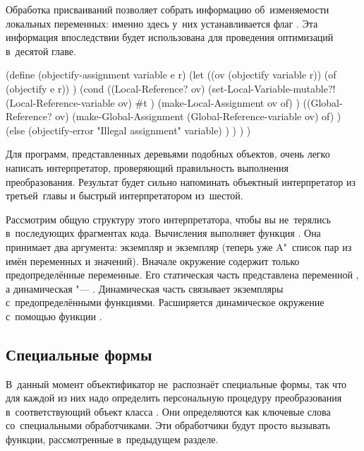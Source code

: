 Обработка присваиваний позволяет собрать информацию об~изменяемости локальных
переменных: именно здесь у~них устанавливается флаг . Эта
информация впоследствии будет использована для проведения оптимизаций в~десятой
главе. \seePage[chapter:cc]

\begin{code:lisp}
(define (objectify-assignment variable e r)
  (let ((ov (objectify variable r))
        (of (objectify e r)) )
    (cond ((Local-Reference? ov)
           (set-Local-Variable-mutable?!
            (Local-Reference-variable ov) #t )
           (make-Local-Assignment ov of) )
          ((Global-Reference? ov)
           (make-Global-Assignment (Global-Reference-variable ov) of) )
          (else
           (objectify-error "Illegal assignment" variable) ) ) ) )
\end{code:lisp}

Для программ, представленных деревьями подобных объектов, очень легко написать
интерпретатор, проверяющий правильность выполнения преобразования. Результат
будет сильно напоминать объектный интерпретатор из третьей~главы и быстрый
интерпретатором из~шестой.

Рассмотрим общую структуру этого интерпретатора, чтобы вы не~терялись
в~последующих фрагментах кода. Вычисления выполняет функция . Она
принимает два аргумента: экземпляр  и экземпляр 
(теперь уже A"~список пар из имён переменных и значений). Вначале окружение
содержит только предопределённые переменные. Его статическая часть представлена
переменной , а динамическая "--- . Динамическая часть
связывает экземпляры  с~предопределёнными функциями.
Расширяется динамическое окружение с~помощью функции .


\subsection{Специальные формы}\label{macros/macrosystem/ssect:special}

В~данный момент объектификатор не~распознаёт специальные формы, так что для
каждой из них надо определить персональную процедуру преобразования
в~соответствующий объект класса . Они определяются как ключевые
слова со~специальными обработчиками. Эти обработчики будут просто вызывать
функции, рассмотренные в~предыдущем разделе.

